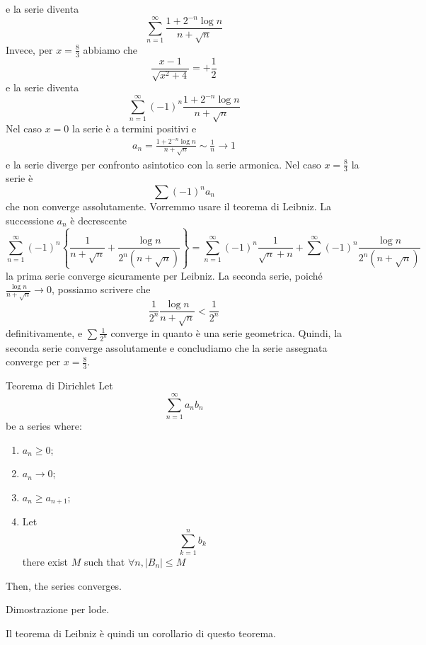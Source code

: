 \documentclass[a4paper]{article}
\begin{document}
\begin{snippetexample}{}
\[    \]
    e la serie diventa
    \[
        \sum_{n=1}^\infty \frac{1 + 2^{-n} \log n}{n+\sqrt{n}}
    \]
    Invece, per \(x=\frac{8}{3}\) abbiamo che
    \[
        \frac{x-1}{\sqrt{x^2+4}} = +\frac{1}{2}
    \]
    e la serie diventa
    \[
        \sum_{n=1}^\infty {(-1)}^n \frac{1 + 2^{-n} \log n}{n+\sqrt{n}}
    \]
    Nel caso \(x=0\) la serie è a termini positivi e
    \begin{align*}
        a_n =  \frac{1 + 2^{-n} \log n}{n+\sqrt{n}} \sim \frac{1}{n} \to 1
    \end{align*}
    e la serie diverge per confronto asintotico con la serie armonica.
    Nel caso \(x=\frac{8}{3}\) la serie è
    \[
        \sum {(-1)}^n a_n
    \]
    che non converge assolutamente.
    Vorremmo usare il teorema di Leibniz. La successione \(a_n\)
    è decrescente
    \[
        \sum_{n=1}^\infty {(-1)}^n
        \left\{
            \frac{1}{n+\sqrt{n}} + \frac{\log n}{2^n (n+\sqrt{n})}
        \right\}
        = \sum_{n=1}^\infty {(-1)}^n \frac{1}{\sqrt{n} + n} + \sum^\infty
        {(-1)}^n \frac{\log n}{2^n (n+\sqrt{n})}
    \]
    la prima serie converge sicuramente per Leibniz.
    La seconda serie, poiché \(\frac{\log n}{n+\sqrt{n}} \to 0\), possiamo scrivere che
    \[
        \frac{1}{2^n} \frac{\log n}{n+\sqrt{n}} < \frac{1}{2^n}
    \]
    definitivamente,
    e \(\sum \frac{1}{2^n}\) converge in quanto è una serie geometrica.
    Quindi, la seconda serie converge assolutamente e concludiamo che la serie assegnata converge
    per \(x=\frac{8}{3}\).
\end{snippetexample}

\begin{snippettheorem}{Teorema di Dirichlet}
    Let \[
        \sum_{n=1}^\infty a_n b_n
    \]
    be a series where:
    \begin{enumerate}
        \item \(a_n \geq 0\);
        \item \(a_n \to 0\);
        \item \(a_n \geq a_{n+1}\);
        \item Let \[ \sum_{k=1}^n b_k \]
        there exist \(M\) such that \(\forall n, |B_n| \leq M\)
    \end{enumerate}
    Then, the series converges.
\end{snippettheorem}
Dimostrazione per lode.

Il teorema di Leibniz è quindi un corollario di questo teorema.
\end{document}
